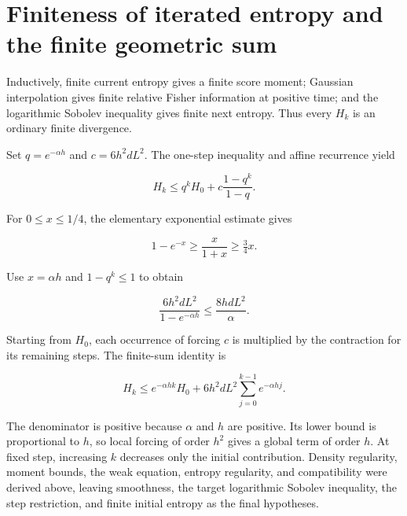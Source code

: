 \documentclass[11pt,a4paper]{report}
\begin{document}
\section{\texorpdfstring{Finiteness of iterated entropy and the finite geometric sum}{Finiteness of iterated entropy and the finite geometric sum}}


Inductively, finite current entropy gives a finite score moment; Gaussian interpolation gives finite relative Fisher information at positive time; and the logarithmic Sobolev inequality gives finite next entropy. Thus every \(H_k\) is an ordinary finite divergence.



Set \(q=e^{-\alpha h}\) and \(c=6h^2dL^2\). The one-step inequality and affine recurrence \cite[Section~3.15.2]{LangevinLean2026ULASC} yield

\[H_k\le q^kH_0+c\frac{1-q^k}{1-q}.\]

For \(0\le x\le1/4\), the elementary exponential estimate gives

\[1-e^{-x}\ge\frac{x}{1+x}\ge\tfrac34x.\]

Use \(x=\alpha h\) and \(1-q^k\le1\) to obtain

\[\frac{6h^2dL^2}{1-e^{-\alpha h}}\le\frac{8hdL^2}{\alpha}.\]

Starting from \(H_0\), each occurrence of forcing \(c\) is multiplied by the contraction for its remaining steps. The finite-sum identity \cite[Section~3.15.1]{LangevinLean2026ULASC} is

\[H_k\le e^{-\alpha hk}H_0+
6h^2dL^2\sum_{j=0}^{k-1}e^{-\alpha hj}.\]

The denominator is positive because \(\alpha\) and \(h\) are positive. Its lower bound is proportional to \(h\), so local forcing of order \(h^2\) gives a global term of order \(h\). At fixed step, increasing \(k\) decreases only the initial contribution. Density regularity, moment bounds, the weak equation, entropy regularity, and compatibility were derived above, leaving smoothness, the target logarithmic Sobolev inequality, the step restriction, and finite initial entropy as the final hypotheses.
\end{document}
